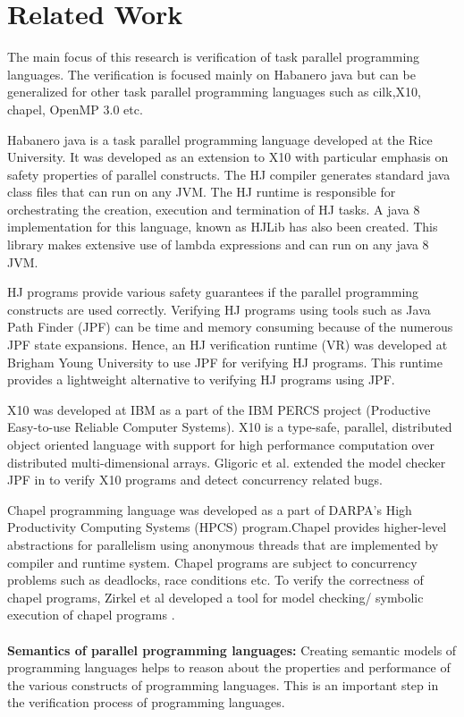 \section{Related Work}

The main focus of this research is verification of task parallel programming languages. The verification is focused mainly on Habanero java but can be generalized for other task parallel programming languages such as cilk,X10, chapel, OpenMP 3.0 etc.

Habanero java \cite{cave2011habanero} is a task parallel programming language developed at the Rice University. It was developed as an extension to X10 with particular emphasis on safety properties of parallel constructs. The HJ compiler generates standard java class files that can run on any JVM. The HJ runtime is responsible for orchestrating the creation, execution and termination of HJ tasks. A java 8 implementation for this language, known as HJLib \cite{imam2014habanero} has also been created. This library makes extensive use of lambda expressions and can run on any java 8 JVM.

HJ programs provide various safety guarantees if the parallel programming constructs are used correctly. Verifying HJ programs using tools such as Java Path Finder (JPF) can be time and memory consuming because of the numerous JPF state expansions. Hence, an HJ verification runtime (VR) \cite{anderson2014jpf} was developed at Brigham Young University to use JPF for verifying HJ programs. This runtime provides a lightweight alternative to verifying HJ programs using JPF.

X10 \cite{charles2005x10} was developed at IBM as a part of the IBM PERCS project (Productive Easy-to-use Reliable Computer Systems). X10 is a type-safe, parallel, distributed object oriented language with support for high performance computation over distributed multi-dimensional arrays. Gligoric et al. extended the model checker JPF in \cite{gligoric2012x10x} to verify X10 programs and detect concurrency related bugs.

Chapel programming language \cite{chamberlain2007parallel} was developed as a part of DARPA's High Productivity Computing Systems (HPCS) program.Chapel provides higher-level abstractions for parallelism using anonymous threads that are implemented by compiler and runtime system. Chapel programs are subject to concurrency problems such as deadlocks, race conditions etc. To verify the correctness of chapel programs, Zirkel et al developed a tool for model checking/ symbolic execution of chapel programs \cite{zirkel2013automated}.
\\
\\
\textbf{Semantics of parallel programming languages:}
Creating semantic models of programming languages helps to reason about the properties and performance of the various constructs of programming languages. This is an important step in the verification process of programming languages.

